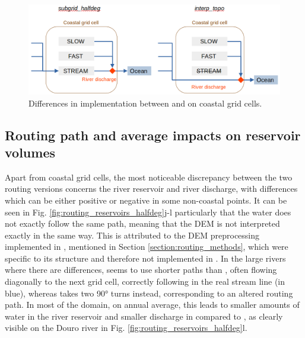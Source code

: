 
\begin{figure}[htbp]
    \centering
    \includegraphics[width=\textwidth]{images/chap3/coastal_routing_behaviour_v3.png
}
    \caption{Differences in implementation between \std and \native on coastal grid cells.}
    \label{fig:coastal_routing_behaviour}
\end{figure}

\subsection{Routing path and average impacts on reservoir volumes}
Apart from coastal grid cells, the most noticeable discrepancy between the two routing versions concerns the river reservoir and river discharge, with differences which can be either positive or negative in some non-coastal points. It can be seen in Fig. \ref{fig:routing_reservoirs_halfdeg}j-l particularly that the water does not exactly follow the same path, meaning that the DEM is not interpreted exactly in the same way. 
This is attributed to the DEM preprocessing implemented in \std, mentioned in Section \ref{section:routing_methods}, which were specific to its structure and therefore not implemented in \native. In the large rivers where there are differences, \native seems to use shorter paths than \std, often flowing diagonally to the next grid cell, correctly following in the real stream line (in blue), whereas \std takes two 90° turns instead, corresponding to an altered routing path. 
In most of the domain, on annual average, this leads to smaller amounts of water in the river reservoir and smaller discharge in \native compared to \std, as clearly visible on the Douro river in Fig. \ref{fig:routing_reservoirs_halfdeg}l.

